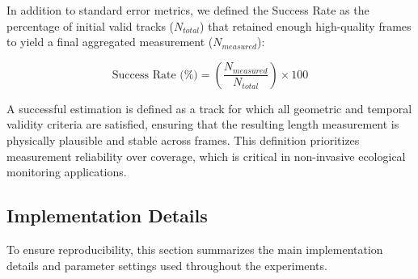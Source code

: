 \documentclass[utf8]{FrontiersinHarvard} %
\begin{document}
In addition to standard error metrics, we defined the Success Rate as the percentage of initial valid tracks ($N_{total}$) that retained enough high-quality frames to yield a final aggregated measurement ($N_{measured}$):

\begin{equation}
    \text{Success Rate (\%)} = \left( \frac{N_{measured}}{N_{total}} \right) \times 100
    \label{eq:success_rate}
\end{equation}

A successful estimation is defined as a track for which all geometric and temporal validity criteria are satisfied, ensuring that the resulting length measurement is physically plausible and stable across frames. This definition prioritizes measurement reliability over coverage, which is critical in non-invasive ecological monitoring applications.


\subsection{Implementation Details}\label{subsec::implemdetail}

To ensure reproducibility, this section summarizes the main implementation details and parameter settings used throughout the experiments.
\end{document}
